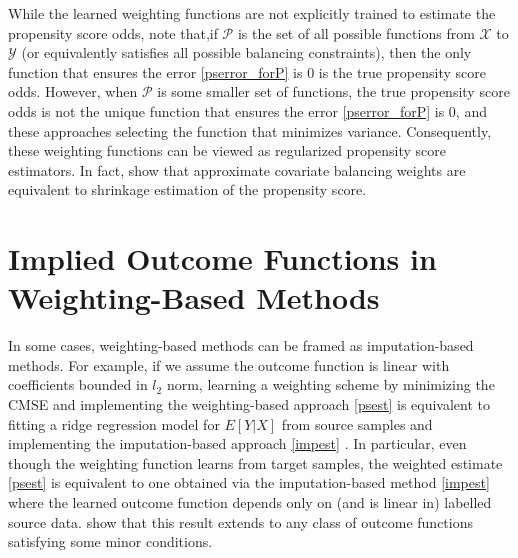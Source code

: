 \documentclass{article} %
\begin{document}
While the learned weighting functions are not explicitly trained to estimate the propensity score odds, note that,if $\mathcal{P}$ is the set of all possible functions from $\mathcal{X}$ to $\mathcal{Y}$ (or equivalently satisfies all possible balancing constraints), then the only function that ensures the error \ref{pserror_forP} is 0 is the true propensity score odds. However, when $\mathcal{P}$ is some smaller set of functions, the true propensity score odds is not the unique function that ensures the error \ref{pserror_forP} is 0, and these approaches selecting the function that minimizes variance. Consequently, these weighting functions can be viewed as regularized propensity score estimators. In fact, \cite{wang2020minimal} show that approximate covariate balancing weights are equivalent to shrinkage estimation of the propensity score.


\section{Implied Outcome Functions in Weighting-Based Methods}
In some cases, weighting-based methods can be framed as imputation-based methods. For example, if we assume the outcome function is linear with coefficients bounded in $l_2$ norm, learning a weighting scheme by minimizing the CMSE and implementing the weighting-based approach \ref{psest} is equivalent to fitting a ridge regression model for $E[Y|X]$ from source samples and implementing the imputation-based approach \ref{impest} \citep{zhao2017entropy}. In particular, even though the weighting function learns from target samples, the weighted estimate \ref{psest} is equivalent to one obtained via the imputation-based method \ref{impest} where the learned outcome function depends only on (and is linear in) labelled source data. \cite{bruns-smith2022} show that this result extends to any class of outcome functions satisfying some minor conditions. 

\end{document}
